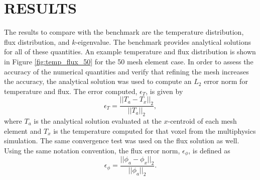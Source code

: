 \documentclass[letterpaper]{mc2023}
\begin{document}
\section{RESULTS}\label{sec:results}
The results to compare with the benchmark are the temperature distribution, flux distribution, and $k$-eigenvalue. The benchmark provides
analytical solutions for all of these quantities. An example temperature and flux distribution is shown in Figure \ref{fig:temp_flux_50}
for the 50 mesh element case. In order to assess the accuracy of the numerical quantities and verify that refining the mesh increases the accuracy, the analytical solution
was used to compute an $L_{2}$ error norm for temperature and flux. The error computed, $\epsilon_{T}$, is given by
\begin{equation}
    \epsilon_{T} = \frac{|| T_{a} - T_{x} ||_{2}}{|| T_{a} ||_{2}},
\end{equation}
where $T_{a}$ is the analytical solution evaluated at the $x$-centroid of each mesh element and $T_{x}$ is the temperature computed for that
voxel from the multiphysics simulation. The same convergence test was used on the flux solution as well. Using the same notation convention,
the flux error norm, $\epsilon_{\phi}$, is defined as
\begin{equation}
    \epsilon_{\phi} =  \frac{|| \phi_{a} - \phi_{x} ||_{2}}{|| \phi_{a} ||_{2}}.
\end{equation}
\end{document}
